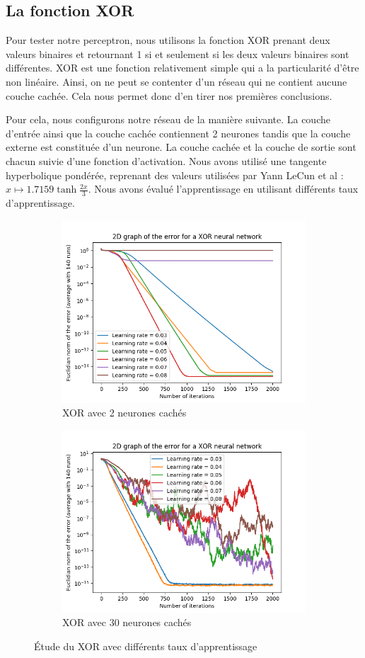 \subsection{La fonction XOR}

Pour tester notre perceptron, nous utilisons la fonction XOR prenant deux valeurs binaires et retournant 1 si et seulement si les deux valeurs binaires sont
différentes. XOR est une fonction relativement simple qui a la particularité d'être non linéaire. Ainsi, on ne peut se contenter d'un réseau qui ne contient aucune
couche cachée. Cela nous permet donc d'en tirer nos premières conclusions.

Pour cela, nous configurons notre réseau de la manière suivante. La couche d'entrée ainsi que la couche cachée contiennent 2 neurones tandis que la couche externe
est constituée d'un neurone. La couche cachée et la couche de sortie sont chacun suivie d'une fonction d'activation. Nous avons utilisé une tangente hyperbolique
pondérée, reprenant des valeurs utilisées par Yann LeCun et al : $ x \mapsto 1.7159\tanh{\frac{2x}{3}}$. Nous avons évalué l'apprentissage en utilisant différents
taux d'apprentissage.

\begin{figure}[h]
 \centering
 \begin{subfigure}{0.5\textwidth}
  \centering
  \includegraphics[width=0.6\linewidth]{img/XOR2D.png}
  \caption{XOR avec 2 neurones cachés}
  \label{fig:xor2D-2}
 \end{subfigure}
 \begin{subfigure}{0.4\textwidth}
  \centering
  \includegraphics[width=0.8\linewidth]{img/XOR30.png}
  \caption{XOR avec 30 neurones cachés}
  \label{fig:xor2D-30}
 \end{subfigure}
 \caption{Étude du XOR avec différents taux d'apprentissage}
 \label{fig:xor2D}
\end{figure}
 
